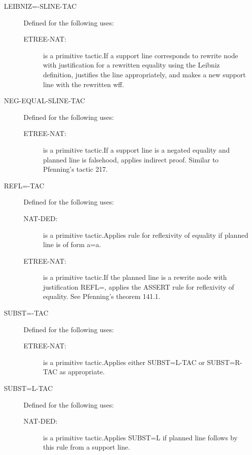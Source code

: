 \begin{description}
\begin{description}
\end{description}

\item[LEIBNIZ=-SLINE-TAC]  Defined for the following uses:
\begin{description}
\item[ETREE-NAT:]  is a primitive tactic.If a support line corresponds to rewrite node with justification
for a rewritten equality using the Leibniz definition, justifies the line 
appropriately, and makes a new support line with the rewritten wff.

\end{description}

\item[NEG-EQUAL-SLINE-TAC]  Defined for the following uses:
\begin{description}
\item[ETREE-NAT:]  is a primitive tactic.If a support line is a negated equality and planned line is falsehood,
applies indirect proof.  Similar to Pfenning's tactic 217.

\end{description}

\item[REFL=-TAC]  Defined for the following uses:
\begin{description}
\item[NAT-DED:]  is a primitive tactic.Applies rule for reflexivity of equality if planned line is of
form a=a.

\item[ETREE-NAT:]  is a primitive tactic.If the planned line is a rewrite node with justification REFL=, applies
the ASSERT rule for reflexivity of equality.  See Pfenning's theorem 141.1.

\end{description}

\item[SUBST=-TAC]  Defined for the following uses:
\begin{description}
\item[ETREE-NAT:]  is a primitive tactic.Applies either SUBST=L-TAC or SUBST=R-TAC as appropriate.

\end{description}

\item[SUBST=L-TAC]  Defined for the following uses:
\begin{description}
\item[NAT-DED:]  is a primitive tactic.Applies SUBST=L if planned line follows by this rule from a support line.


\end{description}
\end{description}
